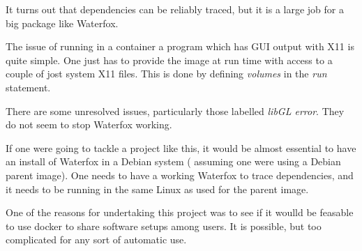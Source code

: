 \documentclass[a4paper]{article}  %
\begin{document}
It turns out that dependencies can be reliably traced, but it is a large job for a big package like Waterfox.

The issue of running in a container a program which has GUI output with X11 is quite simple. One just has to provide the image at run time with access to a couple of jost system X11 files.  This is done by defining {\em volumes} in the {\em run} statement.

There are some unresolved issues, particularly those labelled {\em libGL error}. They do not seem to stop Waterfox working.

If one were going to tackle a project like this, it would be almost essential to have an install of Waterfox in a  Debian system ( assuming one were using a Debian parent image). One needs to have a working Waterfox to trace dependencies,  and it needs to be running in the same Linux as used for the parent image. 

One of the reasons for undertaking this project was to see if it woulld be feasable to use docker to share software setups among users.  It is possible, but too complicated for any sort of automatic use. 
\end{document}
